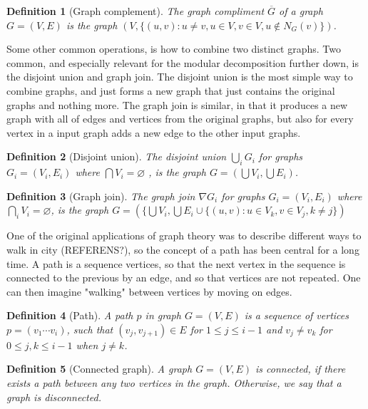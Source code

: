 \documentclass[a4paper]{article}
\newtheorem{definition}{Definition}[section]
\begin{document}
\begin{definition}[Graph complement]
    The graph compliment $\overline{G}$ of a graph $G = (V,E)$ is the graph 
    $(V,\{ (u,v) : u \neq v, u \in V,v \in V, u \notin N_G(v) \})$.
\end{definition}

Some other common operations, is how to combine two distinct graphs. Two common,
and especially relevant for the modular decomposition further down, is the
disjoint union and graph join. The disjoint union is the most simple way to
combine graphs, and just forms a new graph that just contains the original graphs
and nothing more. 
The graph join is similar, in that it produces a new graph with all of edges
and vertices from the original graphs, but also for every vertex in a
input graph adds a new edge to the other input graphs.

\begin{definition}[Disjoint union]
    The disjoint union $\bigcup_i G_i$ for graphs $G_i = (V_i,E_i)$ where 
    $\bigcap V_i = \varnothing $ , is the graph
    $G = \left( \bigcup V_i,\bigcup E_i \right)$.
\end{definition}

\begin{definition}[Graph join]
    The graph join $\nabla G_i$ for graphs $G_i = (V_i,E_i)$ where 
    $\bigcap_i V_i = \varnothing$, is the graph $G = (\{\bigcup V_i,
    \bigcup E_i \cup \{(u,v) : u \in V_k, v \in V_j, k \neq j \})$
\end{definition}


One of the original applications of graph theory was to describe different ways
to walk in city (REFERENS?), so the concept of a path has been central for a long
time.  A path is a sequence vertices, so that the next vertex in the sequence is
connected to the previous by an edge, and so that vertices are not repeated.
One can then imagine "walking" between vertices by moving on edges.

\begin{definition}[Path]
    A path $p$ in graph $G = (V,E)$ is a sequence of vertices $p = (v_1\cdots
    v_i)$, such that $(v_j,v_{j+1}) \in E$ for $1 \leq j \leq i-1$ and $v_j \neq v_k$ 
    for $0 \leq j,k \leq i-1$ when $j \neq k$.
\end{definition}

\begin{definition}[Connected graph]
    A graph $G = (V,E)$ is connected, if there exists a path between any two
    vertices in the graph. Otherwise, we say that a graph is disconnected.
\end{definition}
\end{document}
